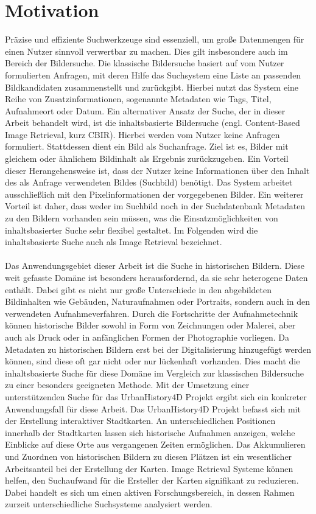 \chapter{Motivation}
Präzise und effiziente Suchwerkzeuge sind essenziell, um große Datenmengen für einen Nutzer sinnvoll verwertbar zu machen. Dies gilt insbesondere auch im Bereich der Bildersuche. Die klassische Bildersuche basiert auf vom Nutzer formulierten Anfragen, mit deren Hilfe das Suchsystem eine Liste an passenden Bildkandidaten zusammenstellt und zurückgibt. Hierbei nutzt das System eine Reihe von Zusatzinformationen, sogenannte Metadaten wie Tags, Titel, Aufnahmeort oder Datum. Ein alternativer Ansatz der Suche, der in dieser Arbeit behandelt wird, ist die inhaltsbasierte Bildersuche (engl. Content-Based Image Retrieval, kurz CBIR). Hierbei werden vom Nutzer keine Anfragen formuliert. Stattdessen dient ein Bild als Suchanfrage. Ziel ist es, Bilder mit gleichem oder ähnlichem Bildinhalt als Ergebnis zurückzugeben. Ein Vorteil dieser Herangehensweise ist, dass der Nutzer keine Informationen über den Inhalt des als Anfrage verwendeten Bildes (Suchbild) benötigt. Das System arbeitet ausschließlich mit den Pixelinformationen der vorgegebenen Bilder. Ein weiterer Vorteil ist daher, dass weder im Suchbild noch in der Suchdatenbank Metadaten zu den Bildern vorhanden sein müssen, was die Einsatzmöglichkeiten von inhaltsbasierter Suche sehr flexibel gestaltet. Im Folgenden wird die inhaltsbasierte Suche auch als Image Retrieval bezeichnet.
\\\\
Das Anwendungsgebiet dieser Arbeit ist die Suche in historischen Bildern. Diese weit gefasste Domäne ist besonders herausfordernd, da sie sehr heterogene Daten enthält. Dabei gibt es nicht nur große Unterschiede in den abgebildeten Bildinhalten wie Gebäuden, Naturaufnahmen oder Portraits, sondern auch in den verwendeten Aufnahmeverfahren. Durch die Fortschritte der Aufnahmetechnik können historische Bilder sowohl in Form von Zeichnungen oder Malerei, aber auch als Druck oder in anfänglichen Formen der Photographie vorliegen. Da Metadaten zu historischen Bildern erst bei der Digitalisierung hinzugefügt werden können, sind diese oft gar nicht oder nur lückenhaft vorhanden. Dies macht die inhaltsbasierte Suche für diese Domäne im Vergleich zur klassischen Bildersuche zu einer besonders geeigneten Methode. Mit der Umsetzung einer unterstützenden Suche für das UrbanHistory4D Projekt \cite{urbanhistory4d} ergibt sich ein konkreter Anwendungsfall für diese Arbeit. Das UrbanHistory4D Projekt befasst sich mit der Erstellung interaktiver Stadtkarten. An unterschiedlichen Positionen innerhalb der Stadtkarten lassen sich historische Aufnahmen anzeigen, welche Einblicke auf diese Orte aus vergangenen Zeiten ermöglichen. Das Akkumulieren und Zuordnen von historischen Bildern zu diesen Plätzen ist ein wesentlicher Arbeitsanteil bei der Erstellung der Karten. Image Retrieval Systeme können helfen, den Suchaufwand für die Ersteller der Karten signifikant zu reduzieren. Dabei handelt es sich um einen aktiven Forschungsbereich, in dessen Rahmen zurzeit unterschiedliche Suchsysteme analysiert werden. 

